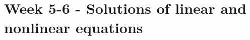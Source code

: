 \documentclass[../main.tex]{subfiles}
\begin{document}
\section{Week 5-6 - Solutions of linear and nonlinear equations}

\end{document}
